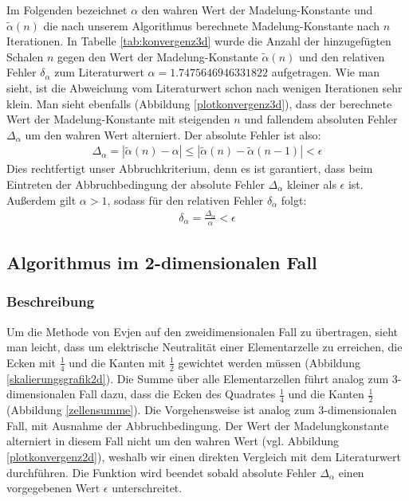 \documentclass[10pt,a4paper]{article}
\begin{document}
Im Folgenden bezeichnet $\alpha$ den wahren Wert der Madelung-Konstante
und $\tilde{\alpha}(n)$ die nach unserem Algorithmus berechnete Madelung-Konstante
nach $n$ Iterationen.
In Tabelle \ref{tab:konvergenz3d} wurde die Anzahl der hinzugefügten Schalen $n$
gegen den Wert der Madelung-Konstante $\tilde{\alpha}(n)$ und den relativen Fehler $\delta_\alpha$ zum
Literaturwert $\alpha = 1.7475646946331822$ \cite{Sakamoto} aufgetragen.
Wie man sieht, ist die Abweichung vom Literaturwert schon nach wenigen Iterationen
sehr klein.
Man sieht ebenfalls (Abbildung \ref{plotkonvergenz3d}), dass der berechnete Wert
der Madelung-Konstante mit steigenden $n$ und fallendem absoluten Fehler $\Delta_\alpha$ um
den wahren Wert alterniert. Der absolute Fehler ist also:
\begin{align}
	\Delta_\alpha = | \tilde{\alpha}(n) - \alpha | \leq | \tilde{\alpha}(n) - \tilde{\alpha}(n-1)| < \epsilon
\end{align}
Dies rechtfertigt unser Abbruchkriterium, denn es ist garantiert, dass beim Eintreten der
Abbruchbedingung der absolute Fehler $\Delta_\alpha$ kleiner als $\epsilon$ ist.
Außerdem gilt $\alpha > 1$, sodass für den relativen Fehler $\delta_\alpha$ folgt:
\begin{align}
	\delta_\alpha = \frac{\Delta_\alpha}{\alpha} < \epsilon
\end{align}

\subsection{Algorithmus im 2-dimensionalen Fall}
\subsubsection{Beschreibung}
Um die Methode von Evjen auf den zweidimensionalen Fall zu übertragen, sieht man leicht,
dass um elektrische Neutralität einer Elementarzelle zu erreichen, die Ecken mit $\frac{1}{4}$
und die Kanten mit $\frac{1}{2}$ gewichtet werden müssen (Abbildung \ref{skalierungsgrafik2d}).
Die Summe über alle Elementarzellen führt analog zum 3-dimensionalen Fall dazu, dass die Ecken
des Quadrates $\frac{1}{4}$ und die Kanten $\frac{1}{2}$ (Abbildung \ref{zellensumme}).
Die Vorgehensweise ist analog zum 3-dimensionalen Fall, mit Ausnahme der Abbruchbedingung.
Der Wert der Madelungkonstante alterniert in diesem Fall nicht um den wahren Wert (vgl. Abbildung \ref{plotkonvergenz2d}), weshalb
wir einen direkten Vergleich mit dem Literaturwert durchführen. Die Funktion wird beendet
sobald absolute Fehler $\Delta_\alpha$ einen vorgegebenen Wert $\epsilon$ unterschreitet.
\end{document}
